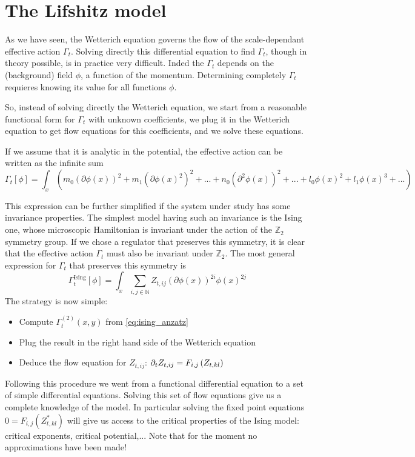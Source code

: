\chapter{The Lifshitz model}

As we have seen, the Wetterich equation governs the flow of the scale-dependant effective action $\Gamma_t$. Solving directly this differential equation to find $\Gamma_t$, though in theory possible, is in practice very difficult. Inded the $\Gamma_t$ depends on the (background) field $\phi$, a function of the momentum. Determining completely $\Gamma_t$ requieres knowing its value for all functions $\phi$. 

So, instead of solving directly the Wetterich equation, we start from a reasonable functional form for $\Gamma_t$ with unknown coefficients, we plug it in the Wetterich equation to get flow equations for this coefficients, and we solve these equations.

If we assume that it is analytic in the potential, the effective action can be written as the infinite sum
\begin{equation}
\Gamma_t[\phi] = \int_{x} \left( m_0 (\partial \phi(x))^2 + m_1 (\partial \phi(x)^2)^2 + ... + n_0 (\partial^2 \phi(x))^2 + ... + l_0 \phi(x)^2 + l_1 \phi(x)^3 +... \right)
\end{equation}

This expression can be further simplified if the system under study has some invariance properties. The simplest model having such an invariance is the Ising one, whose microscopic Hamiltonian is invariant under the action of the $\mathds{Z}_2$ symmetry group. If we chose a regulator that preserves this symmetry, it is clear that the effective action $\Gamma_t$ must also be invariant under $\mathds{Z}_2$. The most general expression for $\Gamma_t$ that preserves this symmetry is
\begin{equation}
\label{eq:ising_anzatz}
\Gamma_t^{\text{Ising}}[\phi] = \int_{x} \sum_{i,j \in \mathds{N}} Z_{t,ij} (\partial \phi(x))^{2i} \phi(x)^{2 j}
\end{equation}
The strategy is now simple:
\begin{itemize}
\item Compute $\Gamma_t^{(2)}(x,y)$ from \ref{eq:ising_anzatz}
\item Plug the result in the right hand side of the Wetterich equation
\item Deduce the flow equation for $Z_{t,ij}$: $\partial_{t} Z_{t,ij} = F_{i,j}\left( {Z_{t,kl}} \right)$
\end{itemize}
Following this procedure we went from a functional differential equation to a set of simple differential equations. Solving this set of flow equations give us a complete knowledge of the model. In particular solving the fixed point equations $0 = F_{i,j}\left( {Z^*_{t,kl}} \right)$ will give us access to the critical properties of the Ising model: critical exponents, critical potential,... Note that for the moment no approximations have been made!

